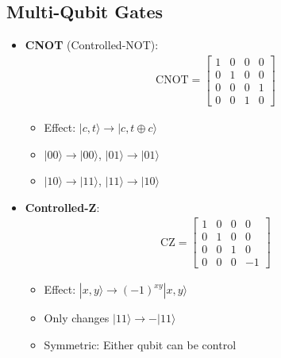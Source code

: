 \begin{multicols}{3}
                  \section*{Multi-Qubit Gates}
                  \begin{itemize}[leftmargin=*,nosep,topsep=0pt]
                    \item \textbf{CNOT} (Controlled-NOT):
                      \begin{align*}
                        \text{CNOT} = \begin{bmatrix}
                          1 & 0 & 0 & 0 \\
                          0 & 1 & 0 & 0 \\
                          0 & 0 & 0 & 1 \\
                          0 & 0 & 1 & 0
                        \end{bmatrix}
                      \end{align*}
                      \begin{itemize}[nosep]
                        \item Effect: $|c,t\rangle \rightarrow |c, t \oplus c\rangle$
                        \item $|00\rangle \to |00\rangle$, $|01\rangle \to |01\rangle$
                        \item $|10\rangle \to |11\rangle$, $|11\rangle \to |10\rangle$
                      \end{itemize}

                    \item \textbf{Controlled-Z}:
                      \begin{align*}
                        \text{CZ} = \begin{bmatrix}
                          1 & 0 & 0 & 0 \\
                          0 & 1 & 0 & 0 \\
                          0 & 0 & 1 & 0 \\
                          0 & 0 & 0 & -1
                        \end{bmatrix}
                      \end{align*}
                      \begin{itemize}[nosep]
                        \item Effect: $|x,y\rangle \to (-1)^{xy}|x,y\rangle$
                        \item Only changes $|11\rangle \to -|11\rangle$
                        \item Symmetric: Either qubit can be control
                      \end{itemize}


\end{itemize}
\end{multicols}
